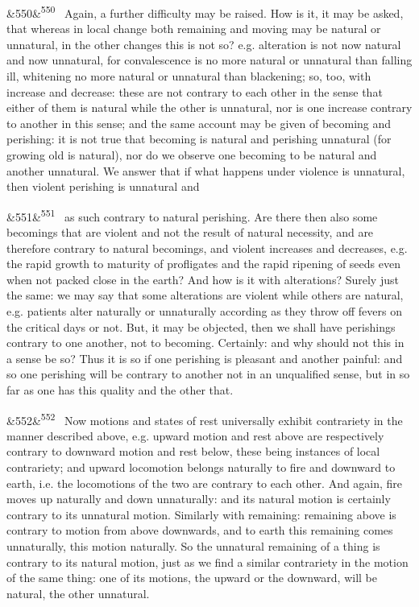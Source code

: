 \documentclass[12pt]{article}
\newcommand{\para}[1][]{\par\noindent\ifx&#1&\else\textsuperscript{\footnotesize #1}~\fi}
\begin{document}
\para[550] Again, a further difficulty may be raised. How is it, it may be asked, that whereas in local change both remaining and moving may be natural or unnatural, in the other changes this is not so? e.g. alteration is not now natural and now unnatural, for convalescence is no more natural or unnatural than falling ill, whitening no more natural or unnatural than blackening; so, too, with increase and decrease: these are not contrary to each other in the sense that either of them is natural while the other is unnatural, nor is one increase contrary to another in this sense; and the same account may be given of becoming and perishing: it is not true that becoming is natural and perishing unnatural (for growing old is natural), nor do we observe one becoming to be natural and another unnatural. We answer that if what happens under violence is unnatural, then violent perishing is unnatural and

\para[551] as such contrary to natural perishing. Are there then also some becomings that are violent and not the result of natural necessity, and are therefore contrary to natural becomings, and violent increases and decreases, e.g. the rapid growth to maturity of profligates and the rapid ripening of seeds even when not packed close in the earth? And how is it with alterations? Surely just the same: we may say that some alterations are violent while others are natural, e.g. patients alter naturally or unnaturally according as they throw off fevers on the critical days or not. But, it may be objected, then we shall have perishings contrary to one another, not to becoming. Certainly: and why should not this in a sense be so? Thus it is so if one perishing is pleasant and another painful: and so one perishing will be contrary to another not in an unqualified sense, but in so far as one has this quality and the other that.

\para[552] Now motions and states of rest universally exhibit contrariety in the manner described above, e.g. upward motion and rest above are respectively contrary to downward motion and rest below, these being instances of local contrariety; and upward locomotion belongs naturally to fire and downward to earth, i.e. the locomotions of the two are contrary to each other. And again, fire moves up naturally and down unnaturally: and its natural motion is certainly contrary to its unnatural motion. Similarly with remaining: remaining above is contrary to motion from above downwards, and to earth this remaining comes unnaturally, this motion naturally. So the unnatural remaining of a thing is contrary to its natural motion, just as we find a similar contrariety in the motion of the same thing: one of its motions, the upward or the downward, will be natural, the other unnatural.
\end{document}
